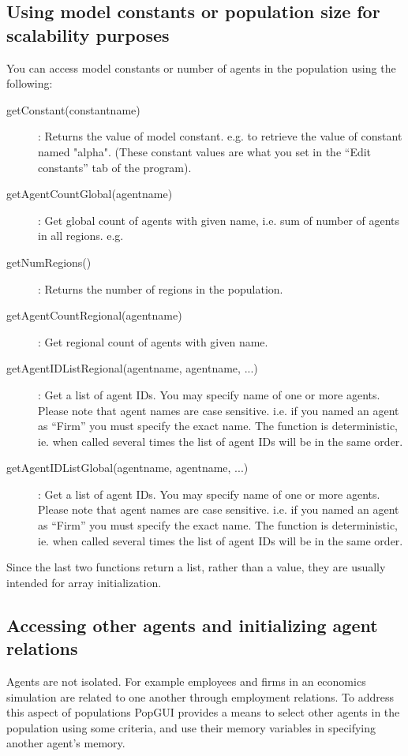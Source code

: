 \subsection{Using model constants or population size for scalability purposes}
You can access model constants or number of agents in the population using the following:
\begin{description}
   \item[getConstant(constantname)]: Returns the value of model constant. e.g.  to retrieve the value of constant named "alpha". (These constant values are what you set in the ``Edit constants'' tab of the program).
   \item[getAgentCountGlobal(agentname)]: Get global count of agents with given name, i.e. sum of number of agents in all regions. e.g. 
   \item[getNumRegions()]: Returns the number of regions in the population.
   \item[getAgentCountRegional(agentname)]: Get regional count of agents with given name.
   \item[getAgentIDListRegional(agentname, agentname, ...)]: Get a list of agent IDs. You may specify name of one or more agents. Please note that agent names are case sensitive. i.e. if you named an agent as ``Firm'' you must specify the exact name. The function is deterministic, ie. when called several times the list of agent IDs will be in the same order.
   \item[getAgentIDListGlobal(agentname, agentname, ...)]: Get a list of agent IDs. You may specify name of one or more agents. Please note that agent names are case sensitive. i.e. if you named an agent as ``Firm'' you must specify the exact name.  The function is deterministic, ie. when called several times the list of agent IDs will be in the same order.
\end{description}
Since the last two functions return a list, rather than a value, they are usually intended for array initialization.

\subsection{Accessing other agents and initializing agent relations}
Agents are not isolated. For example employees and firms in an economics simulation are related to one another through employment relations. To address this aspect of populations PopGUI provides a means to select other agents in the population using some criteria, and use their memory variables in specifying another agent's memory.

